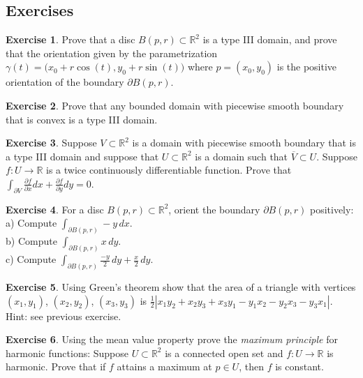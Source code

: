 \documentclass[12pt]{book}
\newcommand{\abs}[1]{\left\lvert {#1} \right\rvert}
\newcommand{\R}{{\mathbb{R}}}
\newcommand{\myindex}[1]{#1\index{#1}}
\theoremstyle{plain}
\theoremstyle{remark}
\theoremstyle{definition}
\theoremstyle{exercise}
\newtheorem{exercise}{Exercise}[section]
\theoremstyle{example}
\begin{document}
\subsection{Exercises}

\begin{exercise} \label{green:balltype3orient}
Prove that a disc $B(p,r) \subset \R^2$ is a type III domain, and prove that
the orientation given by the parametrization $\gamma(t) =
\bigl(x_0+r\cos(t),y_0+r\sin(t)\bigr)$ where $p = (x_0,y_0)$ is the positive
orientation of the boundary $\partial B(p,r)$.
\end{exercise}

\begin{exercise}
Prove that any bounded domain with piecewise smooth boundary that is
convex is a type III domain.
\end{exercise}

\begin{exercise}
Suppose $V \subset \R^2$ is a domain with piecewise smooth boundary that is
a type III domain and suppose that $U \subset \R^2$ is a domain such that
$\overline{V} \subset U$.  Suppose $f \colon U \to \R$ is a twice
continuously differentiable function.  Prove that
$\int_{\partial V}
\frac{\partial f}{\partial x} dx + 
\frac{\partial f}{\partial y} dy = 0$.
\end{exercise}

\begin{exercise}
For a disc $B(p,r) \subset \R^2$, orient the boundary $\partial B(p,r)$
positively:\\
a) Compute $\displaystyle \int_{\partial B(p,r)} -y \, dx$.\\
b) Compute $\displaystyle \int_{\partial B(p,r)} x \, dy$.\\
c) Compute $\displaystyle \int_{\partial B(p,r)} \frac{-y}{2} \, dy + \frac{x}{2} \, dy$.
\end{exercise}

\begin{exercise}
Using Green's theorem show that the area of a triangle with
vertices
$(x_1,y_1)$,
$(x_2,y_2)$,
$(x_3,y_3)$ is
$\frac{1}{2}\abs{x_1y_2 + x_2 y_3 + x_3 y_1 - y_1x_2 - y_2x_3 - y_3x_1}$.
Hint: see previous exercise.
\end{exercise}

\begin{exercise}
Using the mean value property prove the \emph{\myindex{maximum principle}} for harmonic
functions:
Suppose $U \subset \R^2$ is a connected open set and
$f \colon U \to \R$ is harmonic. Prove that
if $f$ attains a maximum at $p \in U$, then $f$ is constant.
\end{exercise}
\end{document}
